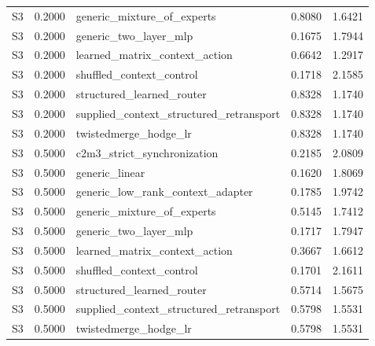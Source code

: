 \begin{table}[t]
\begin{tabular}{lllll}
S3 & 0.2000 & generic\_mixture\_of\_experts & 0.8080 & 1.6421 \\
S3 & 0.2000 & generic\_two\_layer\_mlp & 0.1675 & 1.7944 \\
S3 & 0.2000 & learned\_matrix\_context\_action & 0.6642 & 1.2917 \\
S3 & 0.2000 & shuffled\_context\_control & 0.1718 & 2.1585 \\
S3 & 0.2000 & structured\_learned\_router & 0.8328 & 1.1740 \\
S3 & 0.2000 & supplied\_context\_structured\_retransport & 0.8328 & 1.1740 \\
S3 & 0.2000 & twistedmerge\_hodge\_lr & 0.8328 & 1.1740 \\
S3 & 0.5000 & c2m3\_strict\_synchronization & 0.2185 & 2.0809 \\
S3 & 0.5000 & generic\_linear & 0.1620 & 1.8069 \\
S3 & 0.5000 & generic\_low\_rank\_context\_adapter & 0.1785 & 1.9742 \\
S3 & 0.5000 & generic\_mixture\_of\_experts & 0.5145 & 1.7412 \\
S3 & 0.5000 & generic\_two\_layer\_mlp & 0.1717 & 1.7947 \\
S3 & 0.5000 & learned\_matrix\_context\_action & 0.3667 & 1.6612 \\
S3 & 0.5000 & shuffled\_context\_control & 0.1701 & 2.1611 \\
S3 & 0.5000 & structured\_learned\_router & 0.5714 & 1.5675 \\
S3 & 0.5000 & supplied\_context\_structured\_retransport & 0.5798 & 1.5531 \\
S3 & 0.5000 & twistedmerge\_hodge\_lr & 0.5798 & 1.5531 \\
\bottomrule
\end{tabular}
\end{table}
